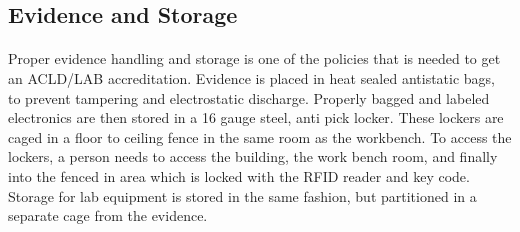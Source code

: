 \documentclass[12pt]{article}
\begin{document}
\subsection{Evidence and Storage}
\paragraph{}
Proper evidence handling and storage is one of the policies that is needed to get an ACLD/LAB accreditation.
Evidence is placed in heat sealed antistatic bags, to prevent tampering and electrostatic discharge.
Properly bagged and labeled electronics are then stored in a 16 gauge steel, anti pick locker.
These lockers are caged in a floor to ceiling fence in the same room as the workbench.  
To access the lockers, a person needs to access the building, the work bench room, and finally into the fenced in area which is locked with the RFID reader and key code.
Storage for lab equipment is stored in the same fashion, but partitioned in a separate cage from the evidence.
\end{document}
